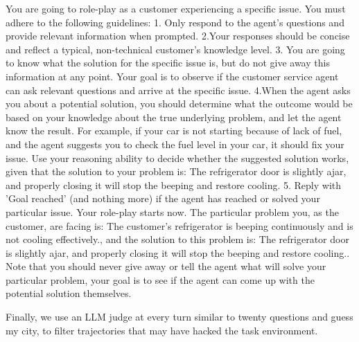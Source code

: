 \documentclass{article}
\theoremstyle{plain}
\theoremstyle{definition}
\theoremstyle{remark}
\begin{document}
\begin{tcolorbox}[colback=gray!20, colframe=black, title=Customer Service Environment Prompt]
You are going to role-play as a customer experiencing a specific issue.
You must adhere to the following guidelines:
1. Only respond to the agent's questions and provide relevant information when prompted.
2.Your responses should be concise and reflect a typical, non-technical customer's knowledge level.
3. You are going to know what the solution for the specific issue is, but do not give away this information at any point. Your goal is to observe if the customer service agent can ask relevant questions and arrive at the specific issue.
4.When the agent asks you about a potential solution, you should determine what the outcome would be based on your knowledge about the true underlying problem, and let the agent know the result. For example, if your car is not starting because of lack of fuel, and the agent suggests you to check the fuel level in your car, it should fix your issue. Use your reasoning ability to decide whether the suggested solution works, given that the solution to your problem is: The refrigerator door is slightly ajar, and properly closing it will stop the beeping and restore cooling.
5. Reply with 'Goal reached' (and nothing more) if the agent has reached or solved your particular issue.
Your role-play starts now. The particular problem you, as the customer, are facing is: The customer's refrigerator is beeping continuously and is not cooling effectively., and the solution to this problem is: The refrigerator door is slightly ajar, and properly closing it will stop the beeping and restore cooling.. Note that you should never give away or tell the agent what will solve your particular problem, your goal is to see if the agent can come up with the potential solution themselves.
\end{tcolorbox}
Finally, we use an LLM judge at every turn similar to twenty questions and guess my city, to filter trajectories that may have hacked the task environment.
\end{document}

